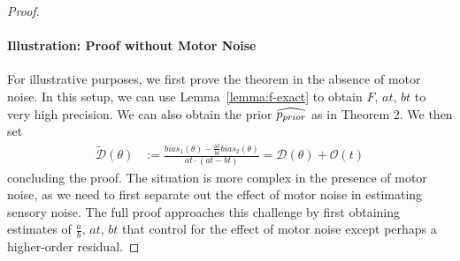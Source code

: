 \begin{proof}
\paragraph*{Illustration: Proof without Motor Noise}
For illustrative purposes, we first prove the theorem in the absence of motor noise.
In this setup, we can use Lemma~\ref{lemma:f-exact} to obtain $F$, $at$, $bt$ to very high precision. We can also obtain the prior $\widehat{p_{prior}}$ as in Theorem 2.
We then set
\begin{align*}
    \tilde{\mathcal{D}}(\theta) &:= \frac{bias_1(\theta) - \frac{at}{bt} bias_2(\theta)}{at \cdot (at - bt)} = \mathcal{D}(\theta)  + \mathcal{O}(t)
    \end{align*}
    concluding the proof.
The situation is more complex in the presence of motor noise, as we need to first separate out the effect of motor noise in estimating sensory noise. 
The full proof approaches this challenge by first obtaining estimates of $\frac{a}{b}$, $at$, $bt$ that control for the effect of motor noise except perhaps a higher-order residual.
    
    

\end{proof}
